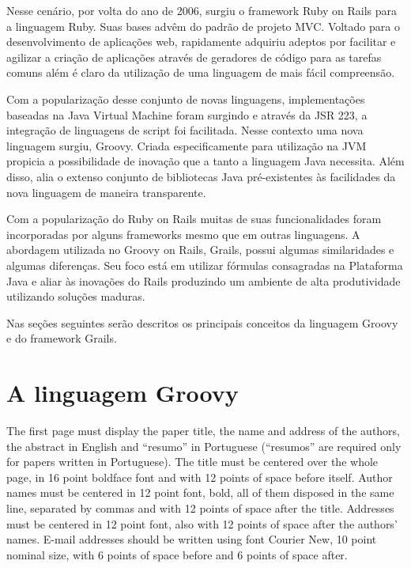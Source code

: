 \documentclass[12pt]{article}
\begin{document}
    Nesse cenário, por volta do ano de 2006, surgiu o framework Ruby on Rails para a linguagem Ruby. Suas bases advêm do padrão de
    projeto MVC. Voltado para o desenvolvimento de aplicações web, rapidamente adquiriu adeptos por facilitar e agilizar a criação 
    de aplicações através de geradores de código para as tarefas comuns além é claro da utilização de uma linguagem de mais fácil
    compreensão.

    Com a popularização desse conjunto de novas linguagens, implementações baseadas na Java Virtual Machine foram surgindo e através 
    da JSR 223, a integração de linguagens de script foi facilitada. Nesse contexto uma nova linguagem surgiu, Groovy. Criada 
    especificamente para utilização na JVM propicia a possibilidade de inovação que a tanto a linguagem Java necessita. Além 
    disso, alia o extenso conjunto de bibliotecas Java pré-existentes às facilidades da nova linguagem de maneira transparente. 
    
    Com a popularização do Ruby on Rails muitas de suas funcionalidades foram incorporadas por alguns frameworks mesmo que em
    outras linguagens. A abordagem utilizada no Groovy on Rails, Grails, possui algumas similaridades e algumas diferenças. 
    Seu foco está em utilizar fórmulas consagradas na Plataforma Java e aliar às inovações do Rails produzindo um ambiente 
    de alta produtividade utilizando soluções maduras.
    
    Nas seções seguintes serão descritos os principais conceitos da linguagem Groovy e do framework Grails.

\section{A linguagem Groovy} \label{sec:firstpage}

    

The first page must display the paper title, the name and address of the
authors, the abstract in English and ``resumo'' in Portuguese (``resumos'' are
required only for papers written in Portuguese). The title must be centered
over the whole page, in 16 point boldface font and with 12 points of space
before itself. Author names must be centered in 12 point font, bold, all of
them disposed in the same line, separated by commas and with 12 points of
space after the title. Addresses must be centered in 12 point font, also with
12 points of space after the authors' names. E-mail addresses should be
written using font Courier New, 10 point nominal size, with 6 points of space
before and 6 points of space after.
\end{document}

